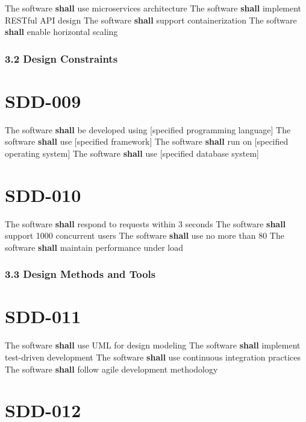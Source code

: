 The software \textbf{shall} use microservices architecture
The software \textbf{shall} implement RESTful API design
The software \textbf{shall} support containerization
The software \textbf{shall} enable horizontal scaling

\subsubsection{3.2 Design Constraints}

\section{SDD-009}\label{SDD-009}

The software \textbf{shall} be developed using [specified programming language]
The software \textbf{shall} use [specified framework]
The software \textbf{shall} run on [specified operating system]
The software \textbf{shall} use [specified database system]

\section{SDD-010}\label{SDD-010}

The software \textbf{shall} respond to requests within 3 seconds
The software \textbf{shall} support 1000 concurrent users
The software \textbf{shall} use no more than 80%
The software \textbf{shall} maintain performance under load

\subsubsection{3.3 Design Methods and Tools}

\section{SDD-011}\label{SDD-011}

The software \textbf{shall} use UML for design modeling
The software \textbf{shall} implement test-driven development
The software \textbf{shall} use continuous integration practices
The software \textbf{shall} follow agile development methodology

\section{SDD-012}\label{SDD-012}

